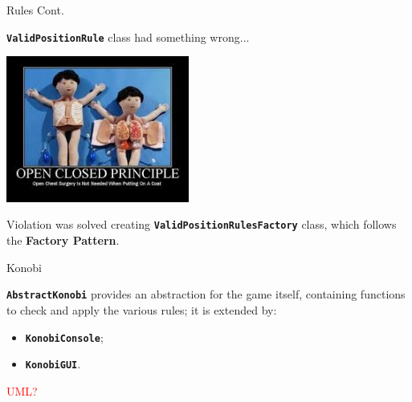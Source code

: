 \documentclass{beamer}
\begin{document}
  \begin{frame} {Rules Cont.}

    \textbf{\texttt{ValidPositionRule}} class had something wrong...

    \vspace{1em}


    \pause
    \hfill
    \includegraphics[width=0.45\textwidth]{img/openclosedprinciple.jpeg}

    \pause

    \vspace{1em}

    Violation was solved creating \textbf{\texttt{ValidPositionRulesFactory}} class, which follows the \textbf{Factory Pattern}.

  \end{frame}


  \begin{frame} {Konobi}

    \texttt{\textbf{AbstractKonobi}} provides an abstraction for the game itself, containing functions to check and apply the various rules; it is extended by:

    \vspace{1em}

    \begin{itemize}
      \item \textbf{\texttt{KonobiConsole}};
      \item \textbf{\texttt{KonobiGUI}}.
    \end{itemize}

    \vspace{1em}

    \textcolor{red}{UML?}


  \end{frame}
\end{document}
